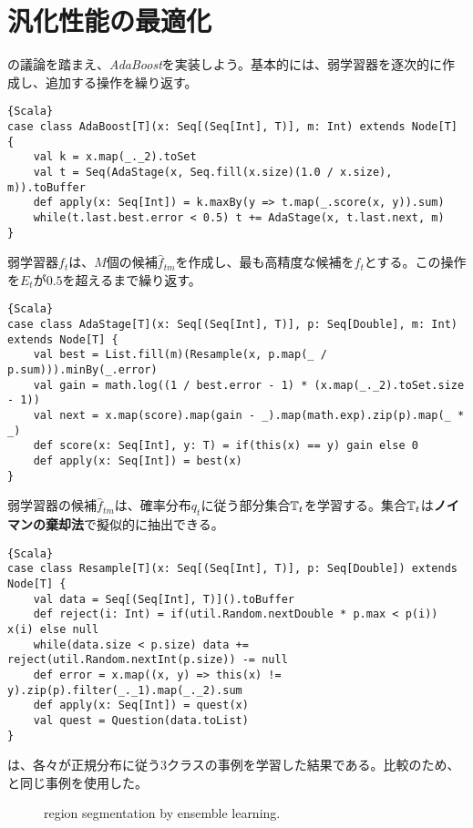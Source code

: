 \documentclass[10pt,a4paper]{book}
\begin{document}
\section{汎化性能の最適化}

の議論を踏まえ、\textit{AdaBoost}を実装しよう。基本的には、弱学習器を逐次的に作成し、追加する操作を繰り返す。

\begin{Verbatim}{Scala}
case class AdaBoost[T](x: Seq[(Seq[Int], T)], m: Int) extends Node[T] {
	val k = x.map(_._2).toSet
	val t = Seq(AdaStage(x, Seq.fill(x.size)(1.0 / x.size), m)).toBuffer
	def apply(x: Seq[Int]) = k.maxBy(y => t.map(_.score(x, y)).sum)
	while(t.last.best.error < 0.5) t += AdaStage(x, t.last.next, m)
}
\end{Verbatim}

弱学習器$f_t$は、$M$個の候補$\hat{f}_{tm}$を作成し、最も高精度な候補を$f_t$とする。この操作を$E_t$が$0.5$を超えるまで繰り返す。

\begin{Verbatim}{Scala}
case class AdaStage[T](x: Seq[(Seq[Int], T)], p: Seq[Double], m: Int) extends Node[T] {
	val best = List.fill(m)(Resample(x, p.map(_ / p.sum))).minBy(_.error)
	val gain = math.log((1 / best.error - 1) * (x.map(_._2).toSet.size - 1))
	val next = x.map(score).map(gain - _).map(math.exp).zip(p).map(_ * _)
	def score(x: Seq[Int], y: T) = if(this(x) == y) gain else 0
	def apply(x: Seq[Int]) = best(x)
}
\end{Verbatim}

弱学習器の候補$\hat{f}_{tm}$は、確率分布$q_t$に従う部分集合$\mathbb{T}_t$を学習する。集合$\mathbb{T}_t$は\textbf{ノイマンの棄却法}で擬似的に抽出できる。

\begin{Verbatim}{Scala}
case class Resample[T](x: Seq[(Seq[Int], T)], p: Seq[Double]) extends Node[T] {
	val data = Seq[(Seq[Int], T)]().toBuffer
	def reject(i: Int) = if(util.Random.nextDouble * p.max < p(i)) x(i) else null
	while(data.size < p.size) data += reject(util.Random.nextInt(p.size)) -= null
	def error = x.map((x, y) => this(x) != y).zip(p).filter(_._1).map(_._2).sum
	def apply(x: Seq[Int]) = quest(x)
	val quest = Question(data.toList)
}
\end{Verbatim}

は、各々が正規分布に従う3クラスの事例を学習した結果である。比較のため、と同じ事例を使用した。

\begin{figure}[h]
\centering
{}
\caption{region segmentation by ensemble learning.\label{fig:dt:ensem}}
\end{figure}
\end{document}
